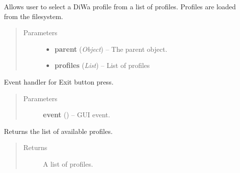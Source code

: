 \documentclass[letterpaper,10pt,english]{sphinxmanual}
\begin{document}

\begin{fulllineitems}
\label{dialogs:dialogs.ChooseDiwaProfileDialog}
Allows user to select a DiWa profile from a list of profiles. Profiles
are loaded from the filesystem.
\begin{quote}\begin{description}
\item[{Parameters}] \leavevmode\begin{itemize}
\item {} 
\textbf{parent} (\emph{Object}) -- The parent object.

\item {} 
\textbf{profiles} (\emph{List}) -- List of profiles

\end{itemize}

\end{description}\end{quote}

\begin{fulllineitems}
\label{dialogs:dialogs.ChooseDiwaProfileDialog.Exit}
Event handler for Exit button press.
\begin{quote}\begin{description}
\item[{Parameters}] \leavevmode
\textbf{event} () -- GUI event.

\end{description}\end{quote}

\end{fulllineitems}


\begin{fulllineitems}
\label{dialogs:dialogs.ChooseDiwaProfileDialog.ListDatabaseProfiles}
Returns the list of available profiles.
\begin{quote}\begin{description}
\item[{Returns}] \leavevmode
A list of profiles.


\end{description}
\end{quote}
\end{fulllineitems}
\end{fulllineitems}
\end{document}
